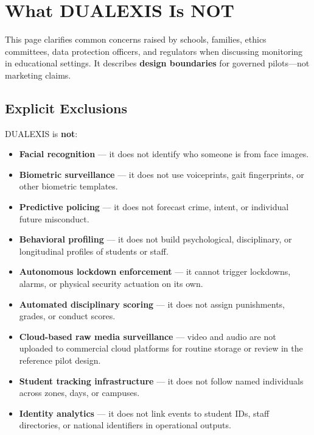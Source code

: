 \section{What DUALEXIS Is NOT}
\label{sec:what-dualxis-is-not}

This page clarifies common concerns raised by schools, families, ethics committees,
data protection officers, and regulators when discussing monitoring in educational settings.
It describes \textbf{design boundaries} for governed pilots---not marketing claims.

\subsection{Explicit Exclusions}

DUALEXIS is \textbf{not}:

\begin{itemize}[noitemsep]
  \item \textbf{Facial recognition} --- it does not identify who someone is from face images.
  \item \textbf{Biometric surveillance} --- it does not use voiceprints, gait fingerprints,
        or other biometric templates.
  \item \textbf{Predictive policing} --- it does not forecast crime, intent, or individual
        future misconduct.
  \item \textbf{Behavioral profiling} --- it does not build psychological, disciplinary,
        or longitudinal profiles of students or staff.
  \item \textbf{Autonomous lockdown enforcement} --- it cannot trigger lockdowns, alarms,
        or physical security actuation on its own.
  \item \textbf{Automated disciplinary scoring} --- it does not assign punishments, grades,
        or conduct scores.
  \item \textbf{Cloud-based raw media surveillance} --- video and audio are not uploaded
        to commercial cloud platforms for routine storage or review in the reference pilot design.
  \item \textbf{Student tracking infrastructure} --- it does not follow named individuals
        across zones, days, or campuses.
  \item \textbf{Identity analytics} --- it does not link events to student IDs, staff directories,
        or national identifiers in operational outputs.
\end{itemize}

